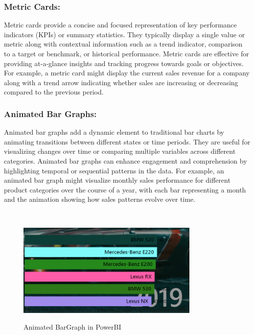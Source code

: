 \documentclass{article}
\begin{document}
{\subsubsection{Metric Cards:}
Metric cards provide a concise and focused representation of key performance indicators (KPIs) or summary statistics. They typically display a single value or metric along with contextual information such as a trend indicator, comparison to a target or benchmark, or historical performance. Metric cards are effective for providing at-a-glance insights and tracking progress towards goals or objectives. For example, a metric card might display the current sales revenue for a company along with a trend arrow indicating whether sales are increasing or decreasing compared to the previous period.

\subsubsection{Animated Bar Graphs:}
Animated bar graphs add a dynamic element to traditional bar charts by animating transitions between different states or time periods. They are useful for visualizing changes over time or comparing multiple variables across different categories. Animated bar graphs can enhance engagement and comprehension by highlighting temporal or sequential patterns in the data. For example, an animated bar graph might visualize monthly sales performance for different product categories over the course of a year, with each bar representing a month and the animation showing how sales patterns evolve over time.

\\
\begin{figure}[htbp]
  \centering
  \vspace{0.3cm}
  \includegraphics[width=0.8\textwidth]{Figures/PowerBI/animated barchart.png}\\
  \caption{Animated BarGraph in PowerBI}
  \vspace{0.3cm}
\end{figure}
\\

}
\end{document}
